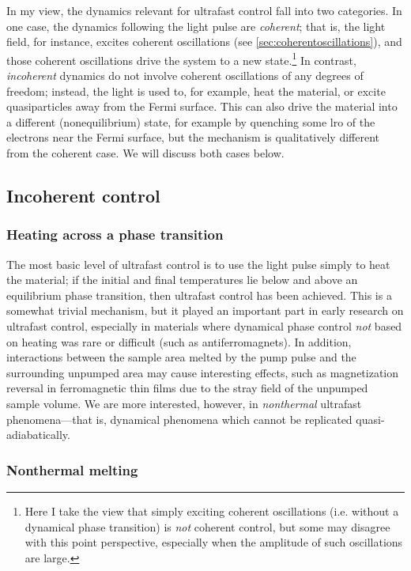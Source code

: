 In my view, the dynamics relevant for ultrafast control fall into two categories.
In one case, the dynamics following the light pulse are \emph{coherent}; that is, the light field, for instance, excites coherent oscillations (see \cref{sec:coherentoscillations}), and those coherent oscillations drive the system to a new state.\footnote{Here I take the view that simply exciting coherent oscillations (i.e. without a dynamical phase transition) is \emph{not} coherent control, but some may disagree with this point perspective, especially when the amplitude of such oscillations are large.}
In contrast, \emph{incoherent} dynamics do not involve coherent oscillations of any degrees of freedom; instead, the light is used to, for example, heat the material, or excite quasiparticles away from the Fermi surface.
This can also drive the material into a different (nonequilibrium) state, for example by quenching some \gls{lro} of the electrons near the Fermi surface, but the mechanism is qualitatively different from the coherent case.
We will discuss both cases below.

\subsection{Incoherent control}

\subsubsection{Heating across a phase transition}

The most basic level of ultrafast control is to use the light pulse simply to heat the material; if the initial and final temperatures lie below and above an equilibrium phase transition, then ultrafast control has been achieved.
This is a somewhat trivial mechanism, but it played an important part in early research on ultrafast control, especially in materials where dynamical phase control \emph{not} based on heating was rare or difficult (such as antiferromagnets\citep{kimel_laser-induced_2004}).
In addition, interactions between the sample area melted by the pump pulse and the surrounding unpumped area may cause interesting effects, such as magnetization reversal in ferromagnetic thin films due to the stray field of the unpumped sample volume\citep{ogasawara_submicron-scale_2009}.
We are more interested, however, in \emph{nonthermal} ultrafast phenomena---that is, dynamical phenomena which cannot be replicated quasi-adiabatically.

\subsubsection{Nonthermal melting}\label{sec:nonthermalmelting}

